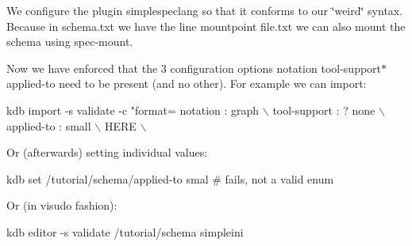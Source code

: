 We configure the plugin {\ttfamily simplespeclang} so that it conforms to our \char`\"{}weird\char`\"{} syntax. Because in {\ttfamily schema.\+txt} we have the line {\ttfamily mountpoint file.\+txt} we can also mount the schema using {\ttfamily spec-\/mount}.

Now we have enforced that the 3 configuration options {\ttfamily notation tool-\/support$\ast$ applied-\/to} need to be present (and no other). For example we can import\+:


\begin{DoxyCode}
kdb import -s validate -c "format=%
notation : graph                                                            \(\backslash\)
tool-support : ? none                                                       \(\backslash\)
applied-to : small                                                          \(\backslash\)
HERE                                                                        \(\backslash\)
\end{DoxyCode}


Or (afterwards) setting individual values\+:


\begin{DoxyCode}
kdb set /tutorial/schema/applied-to smal # fails, not a valid enum
\end{DoxyCode}


Or (in {\ttfamily visudo} fashion)\+:


\begin{DoxyCode}
kdb editor -s validate /tutorial/schema simpleini
\end{DoxyCode}
 